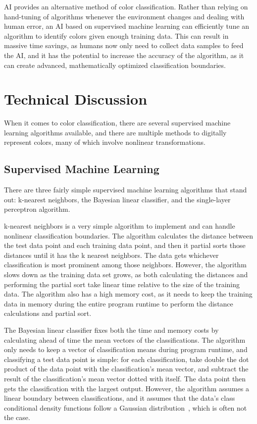 \documentclass[twoside]{IEEEtran}
\begin{document}
AI provides an alternative method of color classification. Rather than relying on hand-tuning of
algorithms whenever the environment changes and dealing with human error, an AI based on
supervised machine learning can efficiently tune an algorithm to identify colors given enough
training data. This can result in massive time savings, as humans now only need to collect data
samples to feed the AI, and it has the potential to increase the accuracy of the algorithm, as it can
create advanced, mathematically optimized classification boundaries.

\section{Technical Discussion}

When it comes to color classification, there are several supervised machine learning algorithms
available, and there are multiple methods to digitally represent colors, many of which involve nonlinear
transformations.

\subsection{Supervised Machine Learning}

There are three fairly simple supervised machine learning algorithms that stand out:
k-nearest neighbors, the Bayesian linear classifier, and the single-layer perceptron algorithm.

k-nearest neighbors is a very simple algorithm to implement and can handle nonlinear
classification boundaries. The algorithm calculates the distance between the test data point and
each training data point, and then it partial sorts those distances until it has the k nearest
neighbors. The data gets whichever classification is most prominent among those neighbors.
However, the algorithm slows down as the training data set grows, as both calculating the
distances and performing the partial sort take linear time relative to the size of the training data.
The algorithm also has a high memory cost, as it needs to keep the training data in memory
during the entire program runtime to perform the distance calculations and partial sort.

The Bayesian linear classifier fixes both the time and memory costs by calculating ahead of time the
mean vectors of the classifications. The algorithm only needs to keep a vector of classification means
during program runtime, and classifying a test data point is simple: for each classification, take double
the dot product of the data point with the classification's mean vector, and subtract the result of the
classification's mean vector dotted with itself. The data point then gets the classification with the
largest output. However, the algorithm assumes a linear boundary between classifications, and it assumes
that the data's class conditional density functions follow a Gaussian distribution~\cite{farmer}, which
is often not the case.
\end{document}
